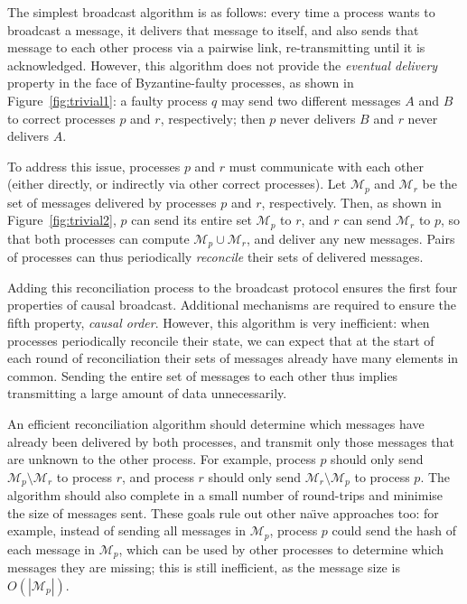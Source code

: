 \documentclass[a4paper,anonymous,USenglish]{lipics-v2019}
\begin{document}
The simplest broadcast algorithm is as follows: every time a process wants to broadcast a message, it delivers that message to itself, and also sends that message to each other process via a pairwise link, re-transmitting until it is acknowledged.
However, this algorithm does not provide the \emph{eventual delivery} property in the face of Byzantine-faulty processes, as shown in Figure~\ref{fig:trivial1}: a faulty process $q$ may send two different messages $A$ and $B$ to correct processes $p$ and $r$, respectively; then $p$ never delivers $B$ and $r$ never delivers $A$.

To address this issue, processes $p$ and $r$ must communicate with each other (either directly, or indirectly via other correct processes).
Let $\mathcal{M}_p$ and $\mathcal{M}_r$ be the set of messages delivered by processes $p$ and $r$, respectively.
Then, as shown in Figure~\ref{fig:trivial2}, $p$ can send its entire set $\mathcal{M}_p$ to $r$, and $r$ can send $\mathcal{M}_r$ to $p$, so that both processes can compute $\mathcal{M}_p \cup \mathcal{M}_r$, and deliver any new messages.
Pairs of processes can thus periodically \emph{reconcile} their sets of delivered messages.

Adding this reconciliation process to the broadcast protocol ensures the first four properties of causal broadcast.
Additional mechanisms are required to ensure the fifth property, \emph{causal order}.
However, this algorithm is very inefficient: when processes periodically reconcile their state, we can expect that at the start of each round of reconciliation their sets of messages already have many elements in common.
Sending the entire set of messages to each other thus implies transmitting a large amount of data unnecessarily.

An efficient reconciliation algorithm should determine which messages have already been delivered by both processes, and transmit only those messages that are unknown to the other process.
For example, process $p$ should only send $\mathcal{M}_p \setminus \mathcal{M}_r$ to process $r$, and process $r$ should only send $\mathcal{M}_r \setminus \mathcal{M}_p$ to process $p$.
The algorithm should also complete in a small number of round-trips and minimise the size of messages sent.
These goals rule out other na\"{\i}ve approaches too: for example, instead of sending all messages in $\mathcal{M}_p$, process $p$ could send the hash of each message in $\mathcal{M}_p$, which can be used by other processes to determine which messages they are missing; this is still inefficient, as the message size is $O(|\mathcal{M}_{p}|)$.
\end{document}
